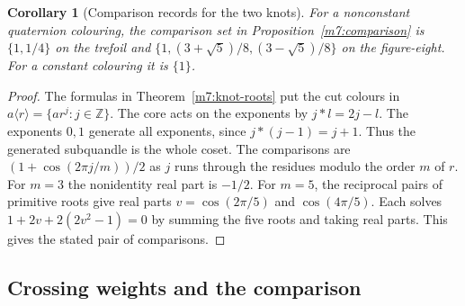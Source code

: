 \documentclass[11pt,reqno]{amsart}
\newtheorem{corollary}[theorem]{Corollary}
\theoremstyle{definition}
\theoremstyle{remark}
\numberwithin{equation}{section}
\newcommand{\Z}{\mathbb{Z}}
\begin{document}
\begin{corollary}[Comparison records for the two knots]\label{m7:knot-comparison}
For a nonconstant quaternion colouring, the comparison set in
Proposition~\ref{m7:comparison} is $\{1,1/4\}$ on the trefoil and
$\{1,(3+\sqrt5)/8,(3-\sqrt5)/8\}$ on the figure-eight.
For a constant colouring it is $\{1\}$.
\end{corollary}
\begin{proof}
The formulas in Theorem~\ref{m7:knot-roots} put the cut colours
in $a\langle r\rangle=\{ar^j:j\in\Z\}$. The core acts on the exponents
by $j*l=2j-l$. The exponents $0,1$ generate all exponents, since
$j*(j-1)=j+1$. Thus the generated subquandle is the whole coset.
The comparisons are $(1+\cos(2\pi j/m))/2$ as $j$ runs through the
residues modulo the order $m$ of $r$. For $m=3$ the nonidentity
real part is $-1/2$. For $m=5$, the reciprocal pairs of primitive
roots give real parts $v=\cos(2\pi/5)$ and $\cos(4\pi/5)$.
Each solves $1+2v+2(2v^2-1)=0$ by summing the five roots and
taking real parts. This gives the stated pair of comparisons.
\end{proof}

\subsection{Crossing weights and the comparison}
\end{document}
